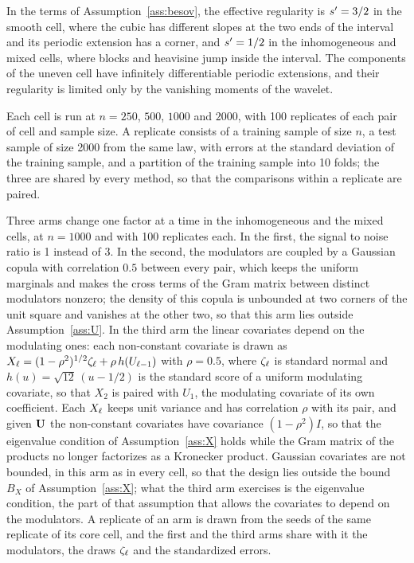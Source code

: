 In the terms of Assumption~\ref{ass:besov}, the effective regularity is
$s' = 3/2$ in the smooth cell, where the cubic has different slopes at the
two ends of the interval and its periodic extension has a corner, and
$s' = 1/2$ in the inhomogeneous and mixed cells, where blocks and heavisine
jump inside the interval. The components of the uneven cell have infinitely
differentiable periodic extensions, and their regularity is limited only by
the vanishing moments of the wavelet.

Each cell is run at $n = 250$, $500$, $1000$ and $2000$, with 100 replicates
of each pair of cell and sample size. A replicate consists of a training
sample of size $n$, a test sample of size 2000 from the same law, with errors
at the standard deviation of the training sample, and a partition of the
training sample into 10 folds; the three are shared by every method, so that
the comparisons within a replicate are paired.

Three arms change one factor at a time in the inhomogeneous and the mixed
cells, at $n = 1000$ and with 100 replicates each. In the first, the signal to
noise ratio is 1 instead of 3. In the second, the modulators are coupled by a
Gaussian copula with correlation $0.5$ between every pair, which keeps the
uniform marginals and makes the cross terms of the Gram matrix between
distinct modulators nonzero; the density of this copula is unbounded at two
corners of the unit square and vanishes at the other two, so that this arm
lies outside Assumption~\ref{ass:U}. In the third arm the linear covariates
depend on the modulating ones: each non-constant covariate is drawn as
$X_\ell = (1-\rho^2)^{1/2} \zeta_\ell + \rho\, h(U_{\ell-1})$ with $\rho = 0.5$,
where $\zeta_\ell$ is standard normal and $h(u) = \sqrt{12}\,(u - 1/2)$ is the
standard score of a uniform modulating covariate, so that $X_2$ is paired with
$U_1$, the modulating covariate of its own coefficient. Each $X_\ell$ keeps
unit variance and has correlation $\rho$ with its pair, and given $\mathbf{U}$ the
non-constant covariates have covariance $(1-\rho^2)I$, so that the eigenvalue
condition of Assumption~\ref{ass:X} holds while the Gram matrix of the
products no longer factorizes as a Kronecker product. Gaussian covariates are
not bounded, in this arm as in every cell, so that the design lies outside the
bound $B_X$ of Assumption~\ref{ass:X}; what the third arm exercises is the
eigenvalue condition, the part of that assumption that allows the covariates
to depend on the modulators. A replicate of an arm is drawn from the seeds of
the same replicate of its core cell, and the first and the third arms share
with it the modulators, the draws $\zeta_\ell$ and the standardized errors.

